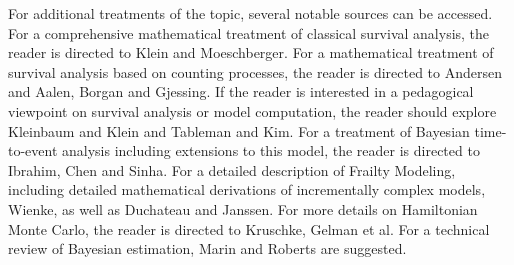 For additional treatments of the topic, several notable sources can be accessed. For a comprehensive mathematical treatment of classical survival analysis, the reader is directed to Klein and Moeschberger\cite{Klein2003}. For a mathematical treatment of survival analysis based on counting processes, the reader is directed to Andersen\cite{Andersen1992} and Aalen, Borgan and Gjessing\cite{Aalen2008}. If the reader is interested in a pedagogical viewpoint on survival analysis or model computation, the reader should explore Kleinbaum and Klein\cite{Kleinbaum2005} and Tableman and Kim\cite{Tableman2004}. For a treatment of Bayesian time-to-event analysis including extensions to this model, the reader is directed to Ibrahim, Chen and Sinha\cite{Ibrahim2005}. For a detailed description of Frailty Modeling, including detailed mathematical derivations of incrementally complex models, Wienke\cite{Wienke2010}, as well as Duchateau and Janssen\cite{Duchateau2008}. For more details on Hamiltonian Monte Carlo, the reader is directed to Kruschke\cite{Kruschke2015}, Gelman et al.\cite{Gelman2014} For a technical review of Bayesian estimation, Marin and Roberts\cite{Marin2007} are suggested.



